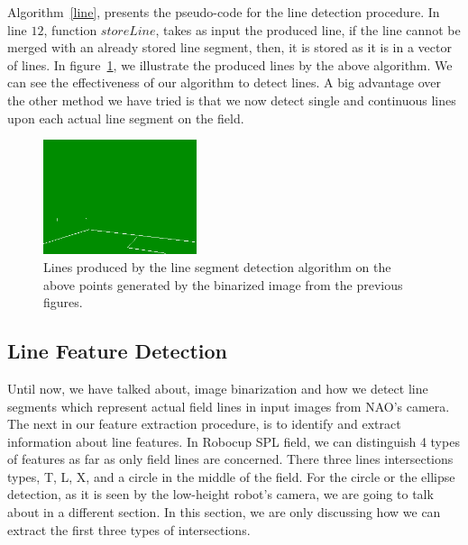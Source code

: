 \documentclass[	DIV=calc,%
							paper=a4,%
							fontsize=9pt,%
							twocolumn]{scrartcl}	 					%
\begin{document}
Algorithm~\ref{line}, presents the pseudo-code for the line detection procedure. In line $12$, function $storeLine$, takes as input the produced line, if the line cannot be merged with an already stored line segment, then, it is stored as it is in a vector of lines. In figure~\ref{lines}, we illustrate the produced lines by the above algorithm. We can see the effectiveness of our algorithm to detect lines. A big advantage over the other method we have tried is that we now detect single and continuous lines upon each actual line segment on the field.

\begin{figure}[t!]
\caption{Lines produced by the line segment detection algorithm on the above points generated by the binarized image from the previous figures.}
\label{lines}
\centering    
\includegraphics[width=0.4\textwidth]{figures/lines.png}
\end{figure}

\subsection{Line Feature Detection}
Until now, we have talked about, image binarization and how we detect line segments which represent actual field lines in input images from NAO's camera. The next in our feature extraction procedure, is to identify and extract information about line features. In Robocup SPL field, we can distinguish 4 types of features as far as only field lines are concerned. There three lines intersections types, T, L, X, and a circle in the middle of the field. For the circle or the ellipse detection, as it is seen by the low-height robot's camera, we are going to talk about in a different section. In this section, we are only discussing how we can extract the first three types of intersections.
\end{document}
